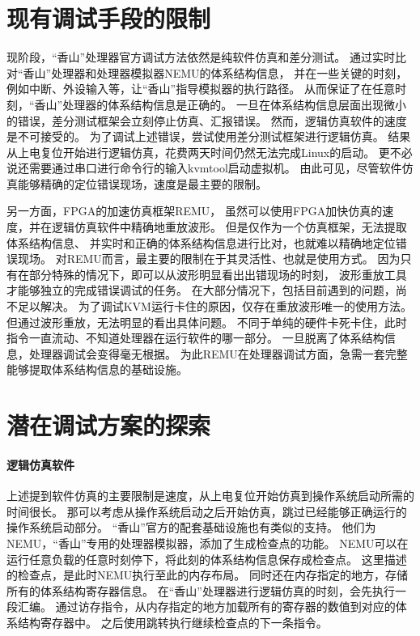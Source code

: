 \section{现有调试手段的限制}
现阶段，“香山”处理器官方调试方法依然是纯软件仿真和差分测试。
通过实时比对“香山”处理器和处理器模拟器NEMU的体系结构信息，
并在一些关键的时刻，例如中断、外设输入等，让“香山”指导模拟器的执行路径。
从而保证了在任意时刻，“香山”处理器的体系结构信息是正确的。
一旦在体系结构信息层面出现微小的错误，差分测试框架会立刻停止仿真、汇报错误。
然而，逻辑仿真软件的速度是不可接受的。
为了调试上述错误，尝试使用差分测试框架进行逻辑仿真。
结果从上电复位开始进行逻辑仿真，花费两天时间仍然无法完成Linux的启动。
更不必说还需要通过串口进行命令行的输入kvmtool启动虚拟机。
由此可见，尽管软件仿真能够精确的定位错误现场，速度是最主要的限制。

另一方面，FPGA的加速仿真框架REMU，
虽然可以使用FPGA加快仿真的速度，并在逻辑仿真软件中精确地重放波形。
但是仅作为一个仿真框架，无法提取体系结构信息、
并实时和正确的体系结构信息进行比对，也就难以精确地定位错误现场。
对REMU而言，最主要的限制在于其灵活性、也就是使用方式。
因为只有在部分特殊的情况下，即可以从波形明显看出出错现场的时刻，
波形重放工具才能够独立的完成错误调试的任务。
在大部分情况下，包括目前遇到的问题，尚不足以解决。
为了调试KVM运行卡住的原因，仅存在重放波形唯一的使用方法。
但通过波形重放，无法明显的看出具体问题。
不同于单纯的硬件卡死卡住，此时指令一直流动、不知道处理器在运行软件的哪一部分。
一旦脱离了体系结构信息，处理器调试会变得毫无根据。
为此REMU在处理器调试方面，急需一套完整能够提取体系结构信息的基础设施。

\section{潜在调试方案的探索}

\paragraph{逻辑仿真软件}
上述提到软件仿真的主要限制是速度，从上电复位开始仿真到操作系统启动所需的时间很长。
那可以考虑从操作系统启动之后开始仿真，跳过已经能够正确运行的操作系统启动部分。
“香山”官方的配套基础设施也有类似的支持。
他们为NEMU，“香山”专用的处理器模拟器，添加了生成检查点的功能。
NEMU可以在运行任意负载的任意时刻停下，将此刻的体系结构信息保存成检查点。
这里描述的检查点，是此时NEMU执行至此的内存布局。
同时还在内存指定的地方，存储所有的体系结构寄存器信息。
在“香山”处理器进行逻辑仿真的时刻，会先执行一段汇编。
通过访存指令，从内存指定的地方加载所有的寄存器的数值到对应的体系结构寄存器中。
之后使用跳转执行继续检查点的下一条指令。

